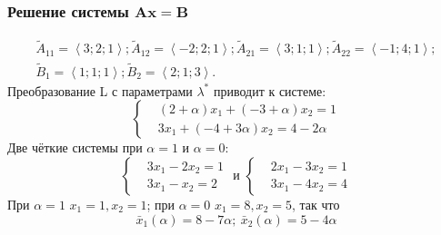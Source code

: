 \documentclass[12pt]{beamer}
\begin{document}

\begin{frame}
  \frametitle{Решение системы $\mathbf{A}\mathbf{x}=\mathbf{B} $}
    \begin{gather*}
      \tilde A_{11} = \left \langle 3; 2; 1 \right \rangle; \tilde A_{12} = \left \langle -2; 2; 1\right \rangle; \tilde A_{21} = \left \langle 3; 1; 1\right \rangle; \tilde A_{22} = \left \langle -1; 4; 1\right \rangle; \\
      \tilde B_1 = \left \langle 1; 1; 1 \right \rangle; \tilde B_2 = \left \langle 2; 1; 3\right \rangle.
  \end{gather*}
  Преобразование L с параметрами $\lambda^*$ приводит к системе:
  \begin{equation}
    \left\lbrace\begin{aligned}
      & \left(2+\alpha\right)x_1+\left(-3+\alpha\right)x_2 = 1 \\
      & 3x_1+\left(-4+3\alpha\right)x_2=4-2\alpha
    \end{aligned}\right.
  \end{equation}
  Две чёткие системы при $\alpha=1$ и $\alpha=0$:
  \begin{equation}
      \left\{\begin{aligned}
        & 3x_1-2x_2 = 1 \\
        & 3x_1-x_2=2
      \end{aligned}\right.
      \text{ и }
      \left\{\begin{aligned}
        & 2x_1-3x_2 = 1 \\
        & 3x_1-4x_2=4
      \end{aligned}\right.
  \end{equation}
  При $\alpha=1$ $x_1 = 1, x_2 = 1$; при $\alpha = 0$ $x_1 = 8, x_2 = 5$, так что
  \begin{equation}
    \bar x_1\left(\alpha\right) = 8 - 7\alpha;\ \bar x_2\left(\alpha\right) = 5 - 4\alpha
  \end{equation}
\end{frame}

\end{document}
